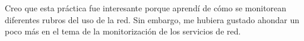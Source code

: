 Creo que esta práctica fue interesante porque aprendí de cómo se monitorean diferentes rubros del uso de la red. Sin embargo, me hubiera gustado ahondar un poco más en el tema de la monitorización de los servicios de red.